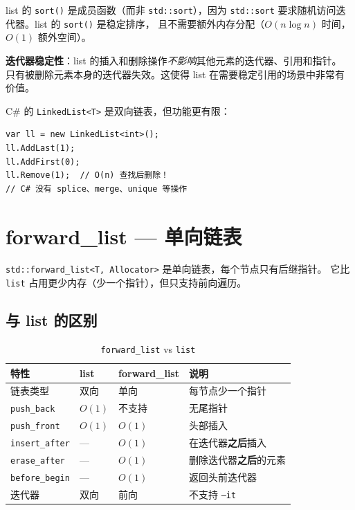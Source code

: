 \documentclass[12pt,a4paper,fontset=fandol]{ctexbook}
\newcommand{\Fn}[1]{\texttt{#1()}}
\newcommand{\Tp}[1]{\texttt{#1}}
\begin{document}
\begin{bestpractice}
list 的 \Fn{sort} 是成员函数（而非 \texttt{std::sort}），因为
\texttt{std::sort} 要求随机访问迭代器。list 的 \Fn{sort} 是稳定排序，
且不需要额外内存分配（$O(n \log n)$ 时间，$O(1)$ 额外空间）。
\end{bestpractice}

\begin{note}
\textbf{迭代器稳定性}：list 的插入和删除操作\emph{不影响}其他元素的迭代器、引用和指针。
只有被删除元素本身的迭代器失效。这使得 list 在需要稳定引用的场景中非常有价值。
\end{note}

\begin{compare}
C\# 的 \texttt{LinkedList<T>} 是双向链表，但功能更有限：
\begin{lstlisting}[style=csharpstyle]
var ll = new LinkedList<int>();
ll.AddLast(1);
ll.AddFirst(0);
ll.Remove(1);  // O(n) 查找后删除！
// C# 没有 splice、merge、unique 等操作
\end{lstlisting}
\end{compare}

\chapter{forward\_list --- 单向链表}

\Tp{std::forward\_list<T, Allocator>} 是单向链表，每个节点只有后继指针。
它比 \Tp{list} 占用更少内存（少一个指针），但只支持前向遍历。

\section{与 list 的区别}

\begin{table}[htbp]
\centering
\caption{\Tp{forward\_list} vs \Tp{list}}
\begin{tabularx}{\textwidth}{l l l X}
\toprule
\textbf{特性} & \textbf{list} & \textbf{forward\_list} & \textbf{说明} \\
\midrule
链表类型 & 双向 & 单向 & 每节点少一个指针 \\
\texttt{push\_back} & $O(1)$ & 不支持 & 无尾指针 \\
\texttt{push\_front} & $O(1)$ & $O(1)$ & 头部插入 \\
\texttt{insert\_after} & --- & $O(1)$ & 在迭代器\textbf{之后}插入 \\
\texttt{erase\_after} & --- & $O(1)$ & 删除迭代器\textbf{之后}的元素 \\
\texttt{before\_begin} & --- & $O(1)$ & 返回头前迭代器 \\
迭代器    & 双向 & 前向 & 不支持 \texttt{--it} \\
\bottomrule
\end{tabularx}
\end{table}
\end{document}

